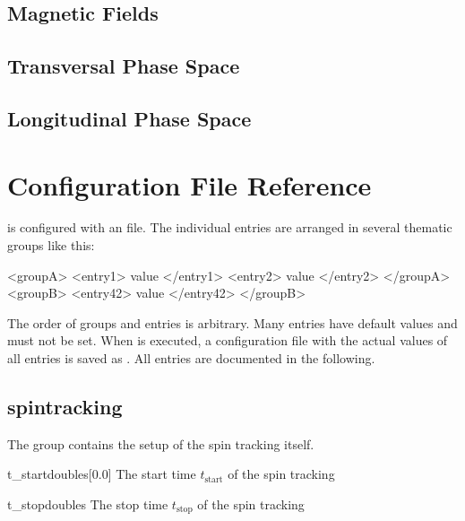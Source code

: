 \documentclass[a4paper]{scrartcl}
\begin{document}
\subsection{Magnetic Fields}
\label{sec:concept-b}

\subsection{Transversal Phase Space}
\label{sec:concept-traj}

\subsection{Longitudinal Phase Space}
\label{sec:concept-gamma}



\section{Configuration File Reference}
\label{sec:config}

\polem is configured with an \xml file. The individual entries are arranged in several
thematic groups like this:
\begin{xmlcode}
  <groupA>
    <entry1> value </entry1>
    <entry2> value </entry2>
  </groupA>
  <groupB>
    <entry42> value </entry42>
  </groupB>
\end{xmlcode}
The order of groups and entries is arbitrary. Many entries have default values and must
not be set. When \polem is executed, a configuration file with the actual values of all
entries is saved as . All entries are
documented in the following.

\subsection{spintracking}
\label{sec:config-spintrk}

The group  contains the setup of the spin tracking itself.\\[2mm]

\begin{configdoc}{t_start}{double}{\si{\s}}[0.0]
  The start time $t_\text{start}$ of the spin tracking
\end{configdoc}

\begin{configdoc}{t_stop}{double}{\si{\s}}
  The stop time $t_\text{stop}$ of the spin tracking
\end{configdoc}
\end{document}
